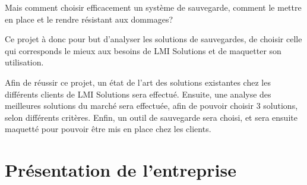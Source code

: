\documentclass[pfe]{tnreport} %
\begin{document}
Mais comment choisir efficacement un système de sauvegarde, comment le mettre en place et le rendre résistant aux dommages?

Ce projet à donc pour but d'analyser les solutions de sauvegardes, de choisir celle qui corresponds le mieux aux besoins de LMI Solutions et de maquetter son utilisation.

Afin de réussir ce projet, un état de l'art des solutions existantes chez les différents clients de LMI Solutions sera effectué.
Ensuite, une analyse des meilleures solutions du marché sera effectuée, afin de pouvoir choisir 3 solutions, selon différents critères.
Enfin, un outil de sauvegarde sera choisi, et sera ensuite maquetté pour pouvoir être mis en place chez les clients.

\cleardoublepage

\chapter{Présentation de l'entreprise}
\end{document}
